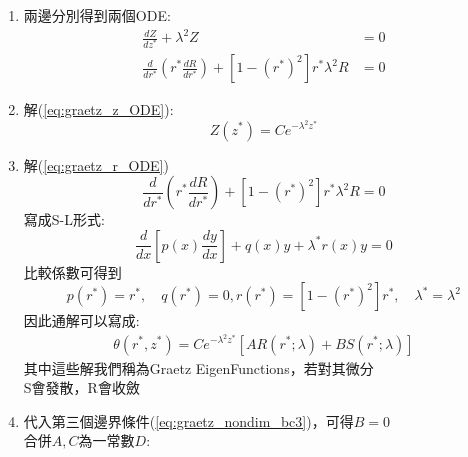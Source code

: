 \documentclass[../main.tex]{subfiles}
\begin{document}
\begin{itemize}
\begin{enumerate}
\begin{align}
          r^\ast \frac{d R}{d r^\ast}
        \right)
      \right] \nonumber\\
      \Rightarrow \frac{1}{Z} \frac{dZ}{d z^\ast} &= \frac{1}{R} \cdot \frac{1}{\left[
        1 - (r^\ast)^2
      \right]} \left[
        \frac{1}{r^\ast} \frac{d}{d r^\ast} \left(
          r^\ast \frac{d R}{d r^\ast}
        \right)
      \right] = -\lambda^2
    \end{align}
    \item 兩邊分別得到兩個ODE:
    \begin{align}
      \frac{dZ}{d z^\ast} + \lambda^2 Z &= 0 \label{eq:graetz_z_ODE}\\
      \frac{d}{d r^\ast} \left(
          r^\ast \frac{d R}{d r^\ast}
        \right) + \left[
        1 - (r^\ast)^2
      \right] r^\ast \lambda^2 R &= 0 \label{eq:graetz_r_ODE}
    \end{align}
    \item 解(\ref{eq:graetz_z_ODE}):
    \begin{equation}
      Z(z^\ast) = C e^{-\lambda^2 z^\ast}
    \end{equation}
    \item 解(\ref{eq:graetz_r_ODE})
    \begin{equation}
      \frac{d}{d r^\ast} \left(
          r^\ast \frac{d R}{d r^\ast}
        \right) + \left[
        1 - (r^\ast)^2
      \right] r^\ast \lambda^2 R = 0
    \end{equation}
    寫成S-L形式:
    \begin{equation}
      \frac{d}{dx}\left[
        p(x)\frac{dy}{dx}
      \right] + q(x)y + \lambda^\ast r(x) y = 0
    \end{equation}
    比較係數可得到
    \begin{equation}
      p(r^\ast) = r^\ast,\quad q(r^\ast) = 0, r(r^\ast) = \left[
        1 - (r^\ast)^2
      \right] r^\ast,\quad \lambda^\ast = \lambda^2
    \end{equation}
    因此通解可以寫成:
    \begin{align}
      \theta(r^\ast, z^\ast) = Ce^{-\lambda^2 z^\ast}\left[
        AR(r^\ast; \lambda) + BS(r^\ast; \lambda)
      \right]
    \end{align}
    其中這些解我們稱為Graetz EigenFunctions，若對其微分\\
    S會發散，R會收斂
    \item 代入第三個邊界條件(\ref{eq:graetz_nondim_bc3})，可得$B=0$\\
    合併$A,C$為一常數$D$:
    \begin{equation}

\end{equation}
\end{enumerate}
\end{itemize}
\end{document}
